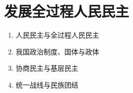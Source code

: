 \documentclass[UTF8]{ctexart}
\begin{document}
\newpage
{}
\BgThispage
\setcounter{section}{7}
\section{发展全过程人民民主}\label{sec:8}

\begin{summary}
\begin{enumerate}
  \item 人民民主与全过程人民民主
  \item 我国政治制度、国体与政体
  \item 协商民主与基层民主
  \item 统一战线与民族团结
\end{enumerate}
\end{summary}
\end{document}
